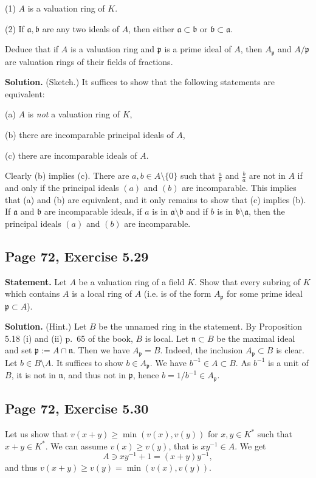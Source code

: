 \documentclass[parskip=half,fontsize=12pt]{scrartcl}%
\newcommand{\mf}{\mathfrak}
\newcommand{\aaa}{\mf a}
\newcommand{\bbb}{\mf b}
\newcommand{\nnn}{\mf n}
\newcommand{\ppp}{\mf p}
\begin{document}
(1) $A$ is a valuation ring of $K$.

(2) If $\aaa, \bbb$ are any two ideals of $A$, then either $\aaa\subset\bbb$ or $\bbb\subset\aaa$.

Deduce that if $A$ is a valuation ring and $\ppp$ is a prime ideal of $A$, then $A_\ppp$  and $A/\ppp$ are valuation rings of their fields of fractions.

\textbf{Solution.} (Sketch.) It suffices to show that the following statements are equivalent:

(a) $A$ is \emph{not} a valuation ring of $K$,

(b) there are incomparable principal ideals of $A$,

(c) there are incomparable ideals of $A$.

Clearly (b) implies (c). There are $a,b\in A\setminus\{0\}$ such that $\frac ab$ and $\frac ba$ are not in $A$ if and only if the principal ideals $(a)$ and $(b)$ are incomparable. This implies that (a) and (b) are equivalent, and it only remains to show that (c) implies (b). If $\aaa$ and $\bbb$ are incomparable ideals, if $a$ is in $\aaa\setminus\bbb$ and if $b$ is in $\bbb\setminus\aaa$, then the principal ideals $(a)$ and $(b)$ are incomparable.

\subsection{Page 72, Exercise 5.29}%

\textbf{Statement.} Let $A$ be a valuation ring of a field $K$. Show that every subring of $K$ which contains $A$ is a local ring of $A$ (i.e. is of the form $A_\ppp$ for some prime ideal $\ppp\subset A$).

\textbf{Solution.} (Hint.) Let $B$ be the unnamed ring in the statement. By Proposition 5.18 (i) and (ii) p.~65 of the book, $B$ is local. Let $\nnn\subset B$ be the maximal ideal and set $\ppp:=A\cap\nnn$. Then we have $A_\ppp=B$. Indeed, the inclusion $A_\ppp\subset B$ is clear. Let $b\in B\setminus A$. It suffices to show $b\in A_\ppp$. We have $b^{-1}\in A\subset B$. As $b^{-1}$ is a unit of $B$, it is not in $\nnn$, and thus not in $\ppp$, hence $b=1/b^{-1}\in A_\ppp$.

\subsection{Page 72, Exercise 5.30}%

Let us show that $v(x+y)\ge\min(v(x),v(y))$ for $x,y\in K^*$ such that $x+y\in K^*$. We can assume $v(x)\ge v(y)$, that is $xy^{-1}\in A$. We get 
$$
A\ni xy^{-1}+1=(x+y)y^{-1},
$$ 
and thus $v(x+y)\ge v(y)=\min(v(x),v(y))$.
\end{document}
